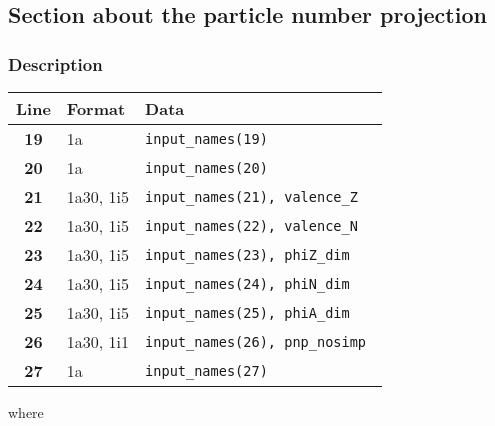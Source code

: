 \documentclass[a4paper,11pt]{article}
\begin{document}
%
%
\subsection{Section about the particle number projection}

\subsubsection*{Description}
\begin{center}
\begin{tabular}{|c|l|l|}
\hline
Line & Format & Data \\
\hline
 \textbf{19}   & 1a        & \tt input\_names(19)              \\
 \textbf{20}   & 1a        & \tt input\_names(20)              \\
 \textbf{21}   & 1a30, 1i5 & \tt input\_names(21), valence\_Z  \\
 \textbf{22}   & 1a30, 1i5 & \tt input\_names(22), valence\_N  \\
 \textbf{23}   & 1a30, 1i5 & \tt input\_names(23), phiZ\_dim   \\
 \textbf{24}   & 1a30, 1i5 & \tt input\_names(24), phiN\_dim   \\
 \textbf{25}   & 1a30, 1i5 & \tt input\_names(25), phiA\_dim   \\
 \textbf{26}   & 1a30, 1i1 & \tt input\_names(26), pnp\_nosimp \\
 \textbf{27}   & 1a        & \tt input\_names(27)              \\
\hline
\end{tabular}
\end{center}
where
\end{document}
